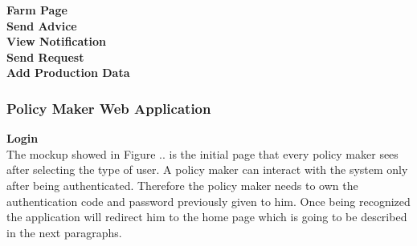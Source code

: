 \textbf{Farm Page}\\ 


\textbf{Send Advice}\\


\textbf{View Notification}\\


\textbf{Send Request}\\


\textbf{Add Production Data}\\


\subsubsection{Policy Maker Web Application}
\textbf{Login} \\
The mockup showed in Figure .. is the initial page that every policy maker sees after selecting the type of user.
A policy maker can interact with the system only after being authenticated. Therefore the policy maker needs to own the authentication code and password previously given to him.
Once being recognized the application will redirect him to the home page which is going to be described in the next paragraphs.